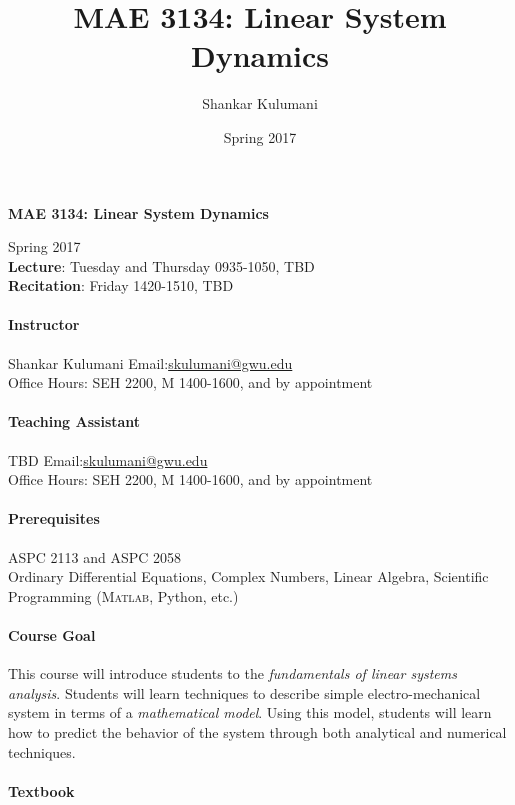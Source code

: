 \documentclass[11pt, reqno]{article}   	%
\title{MAE 3134: Linear System Dynamics}
\author{Shankar Kulumani}
\date{Spring 2017}							%
\begin{document}
{\noindent\Large \textbf{MAE 3134: Linear System Dynamics}}

Spring 2017\\
\textbf{Lecture}: Tuesday and Thursday 0935-1050, TBD \\
\textbf{Recitation}: Friday 1420-1510, TBD
\paragraph{Instructor}
\begin{minipage}[t]{0.8\textwidth}
Shankar Kulumani \quad Email:\href{mailto:skulumani@gwu.edu}{skulumani@gwu.edu}\\
Office Hours: SEH 2200, M 1400-1600, and by appointment
\end{minipage}

\paragraph{Teaching Assistant}
\begin{minipage}[t]{0.8\textwidth}
TBD \quad Email:\href{mailto:skulumani@gwu.edu}{skulumani@gwu.edu}\\
Office Hours: SEH 2200, M 1400-1600, and by appointment
\end{minipage}

\paragraph{Prerequisites}
\begin{minipage}[t]{0.8\textwidth}
ASPC 2113 and ASPC 2058\\
Ordinary Differential Equations, Complex Numbers, Linear Algebra, Scientific Programming (\textsc{Matlab}, Python, etc.)
\end{minipage}

\paragraph{Course Goal} 
This course will introduce students to the \textit{fundamentals of linear systems analysis}.
Students will learn techniques to describe simple electro-mechanical system in terms of a \textit{mathematical model}.
Using this model, students will learn how to predict the behavior of the system through both analytical and numerical techniques.

\paragraph{Textbook}
\end{document}
